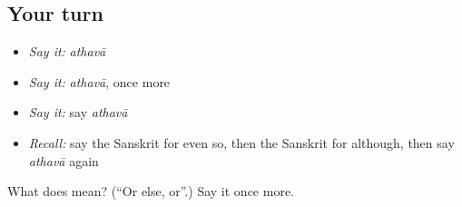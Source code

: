 \subsection*{Your turn}
\begin{itemize}
\raggedright
  \item \emph{Say it:} \emph{athavā}
  \item \emph{Say it:} \emph{athavā}, once more
  \item \emph{Say it:} say \emph{athavā}
  \item \emph{Recall:} say the Sanskrit for even so, then the Sanskrit for although, then say \emph{athavā} again
\end{itemize}

\begin{tcolorbox}[breakable,colback=teal!4,colframe=teal!35!black,title={Before you move on}]
What does  mean? (\textquotedblleft{}Or else, or\textquotedblright{}.) Say it once more.
\end{tcolorbox}
